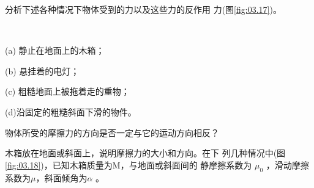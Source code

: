 \begin{questions}

\question 分析下述各种情况下物体受到的力以及这些力的反作用
力(图\ref{fig:03.17})。

\begin{figurex}
    \centering
     \hspace{4em}
    \setcounter{subfigure}{2}
    \\[1em]
    \setcounter{subfigure}{1}
     \hspace{4em}
    \setcounter{subfigure}{3}
    \caption{}
    \label{fig:03.17}
\end{figurex}

(a) 静止在地面上的木箱；

(b) 悬挂着的电灯；

(c) 粗糙地面上被拖着走的重物；

(d)沿固定的粗糙斜面下滑的物件。

\question 物体所受的摩擦力的方向是否一定与它的运动方向相反？

\question 木箱放在地面或斜面上，说明摩擦力的大小和方向。在下
列几种情况中(图\ref{fig:03.18})，已知木箱质量为M，与地面或斜面间的
静摩擦系数为 $ \mu _ { 0 } $  ，滑动摩擦系数为$ \mu $，斜面倾角为$ \alpha $ 。


\end{questions}
